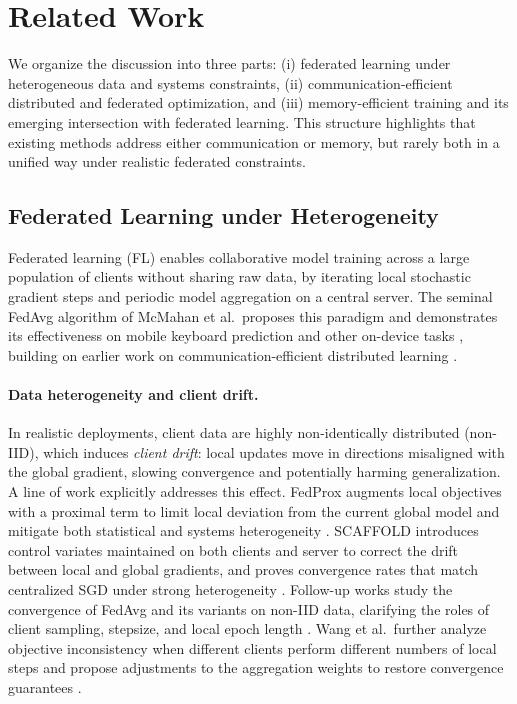 \section{Related Work}

We organize the discussion into three parts: (i) federated learning under heterogeneous data and systems constraints, (ii) communication-efficient distributed and federated optimization, and (iii) memory-efficient training and its emerging intersection with federated learning. This structure highlights that existing methods address either communication or memory, but rarely both in a unified way under realistic federated constraints.

\subsection{Federated Learning under Heterogeneity}

Federated learning (FL) enables collaborative model training across a large population of clients without sharing raw data, by iterating local stochastic gradient steps and periodic model aggregation on a central server. The seminal FedAvg algorithm of McMahan et al.\ proposes this paradigm and demonstrates its effectiveness on mobile keyboard prediction and other on-device tasks \cite{mcmahan2017communication}, building on earlier work on communication-efficient distributed learning \cite{konecny2016federated}.

\paragraph{Data heterogeneity and client drift.}
In realistic deployments, client data are highly non-identically distributed (non-IID), which induces \emph{client drift}: local updates move in directions misaligned with the global gradient, slowing convergence and potentially harming generalization. A line of work explicitly addresses this effect. FedProx augments local objectives with a proximal term to limit local deviation from the current global model and mitigate both statistical and systems heterogeneity \cite{sahu2018fedprox}. SCAFFOLD introduces control variates maintained on both clients and server to correct the drift between local and global gradients, and proves convergence rates that match centralized SGD under strong heterogeneity \cite{karimireddy2020scaffold}. Follow-up works study the convergence of FedAvg and its variants on non-IID data, clarifying the roles of client sampling, stepsize, and local epoch length \cite{li2019convergencefedavg,yang2021linear}. Wang et al.\ further analyze objective inconsistency when different clients perform different numbers of local steps and propose adjustments to the aggregation weights to restore convergence guarantees \cite{wang2020tackling}.

